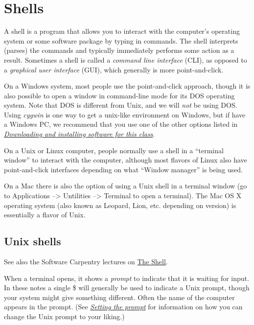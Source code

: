 \documentclass[letterpaper,10pt,english]{sphinxmanual}
\begin{document}
\section{Shells}
\label{shells:id1}\label{shells::doc}\label{shells:shells}
A shell is a program that allows you to interact with the computer's
operating system or some software package by typing in commands.  The shell
interprets (parses) the commands and typically immediately performs some
action as a result.  Sometimes a shell is called a \emph{command line interface}
(CLI), as opposed to a \emph{graphical user interface} (GUI), which generally is
more point-and-click.

On a Windows system, most people use the point-and-click approach,
though it is also possible to open a window in command-line mode
for its DOS operating system. Note that DOS is different from Unix, and
we will \emph{not} be using DOS.  Using \emph{cygwin} is one way to get a
unix-like environment on Windows, but if have a Windows PC, we
recommend that you use one of the other options listed in
{\hyperref[software_installation:software-installation]{\emph{Downloading and installing software for this class}}}.

On a Unix or Linux computer, people normally use a shell in a ``terminal
window'' to interact with the computer, although most flavors of Linux also
have point-and-click interfaces depending on what ``Window manager'' is being
used.

On a Mac there is also the option of using a Unix shell in a terminal window
(go to Applications --\textgreater{} Untilities --\textgreater{} Terminal to open a terminal).
The Mac OS X operating system (also known as Leopard, Lion,
etc. depending on version) is essentially a flavor of Unix.


\subsection{Unix shells}
\label{shells:unix-shells}
See also the Software Carpentry lectures on \href{http://software-carpentry.org/4\_0/shell/index.html}{The Shell}.

When a terminal opens, it shows a \emph{prompt} to indicate that it is waiting
for input. In these notes a single \$ will generally be used to indicate a
Unix prompt, though your system might give something different.  Often the
name of the computer appears in the prompt.   (See {\hyperref[unix:prompt]{\emph{Setting the prompt}}} for
information on how you can change the Unix prompt to your liking.)
\end{document}
